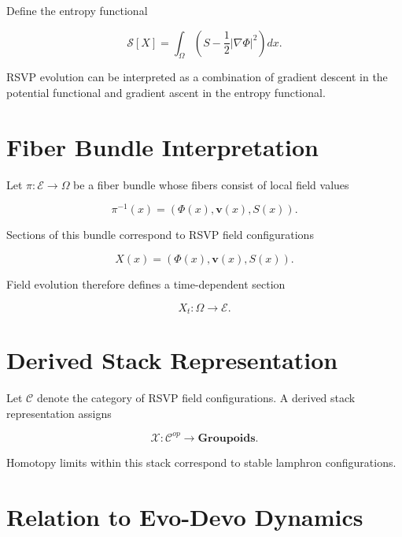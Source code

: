 \documentclass[12pt]{article}
\begin{document}
Define the entropy functional

\begin{equation}
\mathcal{S}[X]
=
\int_{\Omega}
\left(
S
-
\frac{1}{2}
|\nabla \Phi|^2
\right)
dx .
\end{equation}

RSVP evolution can be interpreted as a combination of gradient descent in the potential functional and gradient ascent in the entropy functional.

\section{Fiber Bundle Interpretation}

Let $\pi : \mathcal{E} \to \Omega$ be a fiber bundle whose fibers consist of local field values

\begin{equation}
\pi^{-1}(x)
=
(\Phi(x),\mathbf{v}(x),S(x)).
\end{equation}

Sections of this bundle correspond to RSVP field configurations

\begin{equation}
X(x) = (\Phi(x),\mathbf{v}(x),S(x)).
\end{equation}

Field evolution therefore defines a time-dependent section

\begin{equation}
X_t : \Omega \to \mathcal{E}.
\end{equation}

\section{Derived Stack Representation}

Let $\mathcal{C}$ denote the category of RSVP field configurations. A derived stack representation assigns

\begin{equation}
\mathcal{X} :
\mathcal{C}^{op}
\rightarrow
\mathbf{Groupoids}.
\end{equation}

Homotopy limits within this stack correspond to stable lamphron configurations.

\section{Relation to Evo-Devo Dynamics}
\end{document}
